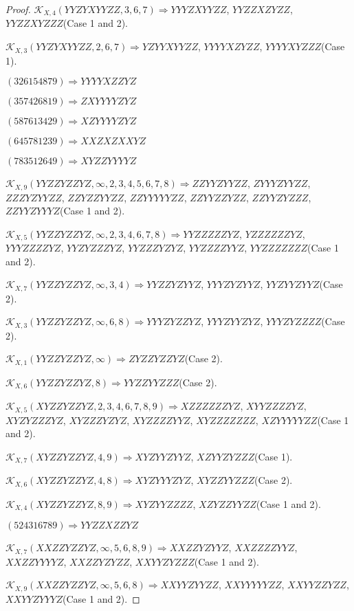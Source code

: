 \documentclass[12pt]{article}
\theoremstyle{plain}
\theoremstyle{definition}
\theoremstyle{remark}
\newcommand{\fancy}[1]{\mathcal{#1}}
\def\K{\fancy{K}}
\begin{document}
\begin{proof}
	$\K_{X,4}(YYZYXYYZZ,3, 6, 7)\Rightarrow $$YYYZXYYZZ$, $YYZZXZYZZ$, $YYZZXYZZZ$(Case 1 and 2).
	
	$\K_{X,3}(YYZYXYYZZ,2, 6, 7)\Rightarrow $$YZYYXYYZZ$, $YYYYXZYZZ$, $YYYYXYZZZ$(Case 1).
	
	
	
	$(3 2 6 1 5 4 8 7 9)\Rightarrow YYYYXZZYZ$
	
	$(3 5 7 4 2 6 8 1 9)\Rightarrow ZXYYYYZYZ$
	
	$(5 8 7 6 1 3 4 2 9)\Rightarrow XZYYYYZYZ$
	
	$(6 4 5 7 8 1 2 3 9)\Rightarrow XXZXZXXYZ$
	
	$(7 8 3 5 1 2 6 4 9)\Rightarrow XYZZYYYYZ$
	
	
	
	$\K_{X,9}(YYZZYZZYZ,\infty,2, 3, 4, 5, 6, 7, 8)\Rightarrow $$ZZYYZYYZZ$, $ZYYYZYYZZ$, $ZZZYZYYZZ$, $ZZYZZYYZZ$, $ZZYYYYYZZ$, $ZZYYZZYZZ$, $ZZYYZYZZZ$, $ZZYYZYYYZ$(Case 1 and 2).
	
	$\K_{X,5}(YYZZYZZYZ,\infty,2, 3, 4, 6, 7, 8)\Rightarrow $$YYZZZZZYZ$, $YZZZZZZYZ$, $YYYZZZZYZ$, $YYZYZZZYZ$, $YYZZZYZYZ$, $YYZZZZYYZ$, $YYZZZZZZZ$(Case 1 and 2).
	
	$\K_{X,7}(YYZZYZZYZ,\infty,3, 4)\Rightarrow $$YYZZYZYYZ$, $YYYZYZYYZ$, $YYZYYZYYZ$(Case 2).
	
	$\K_{X,3}(YYZZYZZYZ,\infty,6, 8)\Rightarrow $$YYYZYZZYZ$, $YYYZYYZYZ$, $YYYZYZZZZ$(Case 2).
	
	$\K_{X,1}(YYZZYZZYZ,\infty)\Rightarrow $$ZYZZYZZYZ$(Case 2).
	
	$\K_{X,6}(YYZZYZZYZ,8)\Rightarrow $$YYZZYYZZZ$(Case 2).
	
	$\K_{X,5}(XYZZYZZYZ,2, 3, 4, 6, 7, 8, 9)\Rightarrow $$XZZZZZZYZ$, $XYYZZZZYZ$, $XYZYZZZYZ$, $XYZZZYZYZ$, $XYZZZZYYZ$, $XYZZZZZZZ$, $XZYYYYYZZ$(Case 1 and 2).
	
	$\K_{X,7}(XYZZYZZYZ,4, 9)\Rightarrow $$XYZYYZYYZ$, $XZYYZYZZZ$(Case 1).
	
	$\K_{X,6}(XYZZYZZYZ,4, 8)\Rightarrow $$XYZYYYZYZ$, $XYZZYYZZZ$(Case 2).
	
	$\K_{X,4}(XYZZYZZYZ,8, 9)\Rightarrow $$XYZYYZZZZ$, $XZYZZYYZZ$(Case 1 and 2).
	
	
	
	$(5 2 4 3 1 6 7 8 9)\Rightarrow YYZZXZZYZ$
	
	
	
	$\K_{X,7}(XXZZYZZYZ,\infty,5, 6, 8, 9)\Rightarrow $$XXZZYZYYZ$, $XXZZZZYYZ$, $XXZZYYYYZ$, $XXZZYZYZZ$, $XXYYZYZZZ$(Case 1 and 2).
	
	$\K_{X,9}(XXZZYZZYZ,\infty,5, 6, 8)\Rightarrow $$XXYYZYYZZ$, $XXYYYYYZZ$, $XXYYZZYZZ$, $XXYYZYYYZ$(Case 1 and 2).
	

\end{proof}
\end{document}
